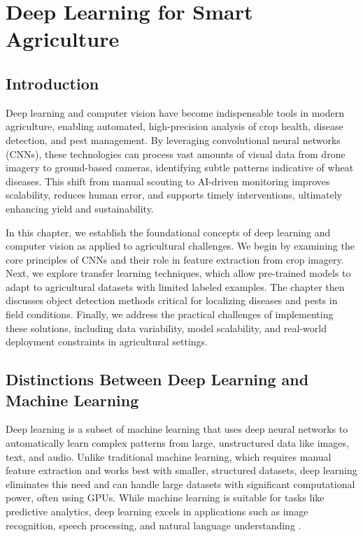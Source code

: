 \chapter{Deep Learning for Smart Agriculture}

\section{Introduction}
Deep learning and computer vision have become indispensable tools in modern agriculture, enabling automated, high-precision analysis of crop health, disease detection, and pest management. By leveraging convolutional neural networks (CNNs), these technologies can process vast amounts of visual data from drone imagery to ground-based cameras, identifying subtle patterns indicative of wheat diseases. This shift from manual scouting to AI-driven monitoring improves scalability, reduces human error, and supports timely interventions, ultimately enhancing yield and sustainability.

In this chapter, we establish the foundational concepts of deep learning and computer vision as applied to agricultural challenges. We begin by examining the core principles of CNNs and their role in feature extraction from crop imagery. Next, we explore transfer learning techniques, which allow pre-trained models to adapt to agricultural datasets with limited labeled examples. The chapter then discusses object detection methods critical for localizing diseases and pests in field conditions. Finally, we address the practical challenges of implementing these solutions, including data variability, model scalability, and real-world deployment constraints in agricultural settings.

\section{Distinctions Between Deep Learning and Machine Learning}
Deep learning is a subset of machine learning that uses deep neural networks to automatically learn complex patterns from large, unstructured data like images, text, and audio. Unlike traditional machine learning, which requires manual feature extraction and works best with smaller, structured datasets, deep learning eliminates this need and can handle large datasets with significant computational power, often using GPUs. While machine learning is suitable for tasks like predictive analytics, deep learning excels in applications such as image recognition, speech processing, and natural language understanding \parencite{AlvarezVanhard2021}.



